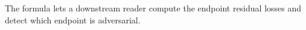 The formula lets a downstream reader compute the endpoint residual losses and detect which endpoint is adversarial.